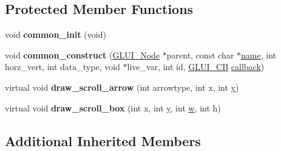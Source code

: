 \subsection*{Protected Member Functions}
\begin{DoxyCompactItemize}
\item 
\hypertarget{class_g_l_u_i___scrollbar_a09f3f6af3b4681b15ed06ce704963e87}{void {\bfseries common\+\_\+init} (void)}\label{class_g_l_u_i___scrollbar_a09f3f6af3b4681b15ed06ce704963e87}

\item 
\hypertarget{class_g_l_u_i___scrollbar_a5973db7a6e64d46a0e991bfe75dd375d}{void {\bfseries common\+\_\+construct} (\hyperlink{class_g_l_u_i___node}{G\+L\+U\+I\+\_\+\+Node} $\ast$parent, const char $\ast$\hyperlink{class_g_l_u_i___control_aa95b97d50df45335fc33f0af03958eb3}{name}, int horz\+\_\+vert, int data\+\_\+type, void $\ast$live\+\_\+var, int id, \hyperlink{class_g_l_u_i___c_b}{G\+L\+U\+I\+\_\+\+C\+B} \hyperlink{class_g_l_u_i___control_a96060fe0cc6d537e736dd6eef78e24ab}{callback})}\label{class_g_l_u_i___scrollbar_a5973db7a6e64d46a0e991bfe75dd375d}

\item 
\hypertarget{class_g_l_u_i___scrollbar_a19a0e1f68295556be9cb2a082b88df41}{virtual void {\bfseries draw\+\_\+scroll\+\_\+arrow} (int arrowtype, int x, int \hyperlink{_ice_utils_8h_aa7ffaed69623192258fb8679569ff9ba}{y})}\label{class_g_l_u_i___scrollbar_a19a0e1f68295556be9cb2a082b88df41}

\item 
\hypertarget{class_g_l_u_i___scrollbar_ac85ec65614a19f146b2f0f2fef506df3}{virtual void {\bfseries draw\+\_\+scroll\+\_\+box} (int x, int \hyperlink{_ice_utils_8h_aa7ffaed69623192258fb8679569ff9ba}{y}, int \hyperlink{class_g_l_u_i___control_aca82a099b9cbbadb188794cbfb06aa27}{w}, int h)}\label{class_g_l_u_i___scrollbar_ac85ec65614a19f146b2f0f2fef506df3}

\end{DoxyCompactItemize}
\subsection*{Additional Inherited Members}


